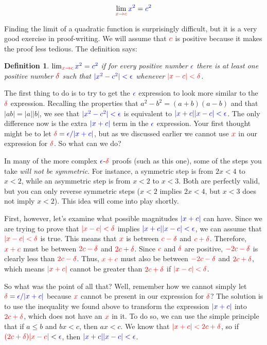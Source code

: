 \documentclass{myarticle}
\newcommand{\hor}[1]{\textcolor{red}{#1}} %
\newcommand{\ver}[1]{\textcolor{blue}{#1}}
\theoremstyle{nospace}
\newtheorem*{oldattempt}{Definition}
\newenvironment{attempt}{\begin{mdframed}\begin{oldattempt}}{\end{oldattempt}\end{mdframed}}
\newtheorem{old series theorem}{Theorem}
\newenvironment{series theorem}{\begin{mdframed}\begin{old series theorem}}{\end{old series theorem}\end{mdframed}}
\begin{document}
\[ \lim_{\hor{x \to c}} \ver{x^2} = \ver{c^2} \]

Finding the limit of a quadratic function is surprisingly difficult, but it is a very good exercise in proof-writing. We will assume that $\hor{c}$ is positive because it makes the proof less tedious. The definition says:

\begin{attempt} $\lim_{\hor{x \to c}} \ver{x^2} = \ver{c^2}$ if for every positive number $\ver{\epsilon}$ there is at least one positive number $\hor{\delta}$ such that $\ver{|x^2 - c^2| < \epsilon}$ whenever $\hor{|x - c| < \delta}$. \end{attempt}

The first thing to do is to try to get the $\ver{\epsilon}$ expression to look more similar to the $\hor{\delta}$ expression. Recalling the properties that $a^2 - b^2 = (a + b)(a - b)$ and that $|ab| = |a||b|$, we see that $\ver{|x^2 - c^2| < \epsilon}$ is equivalent to $\ver{|x + c||x - c| < \epsilon}$. The only difference now is the extra $\ver{|x + c|}$ term in the $\ver{\epsilon}$ expression. Your first thought might be to let $\hor{\delta} = \ver{\epsilon/|x + c|}$, but as we discussed earlier we cannot use $\hor{x}$ in our expression for $\hor{\delta}$. So what can we do?

In many of the more complex $\ver{\epsilon}$-$\hor{\delta}$ proofs (such as this one), some of the steps you take \emph{will not be symmetric}. For instance, a symmetric step is from $2x < 4$ to $x < 2$, while an asymmetric step is from $x < 2$ to $x < 3$. Both are perfectly valid, but you can only reverse symmetric steps ($x < 2$ implies $2x < 4$, but $x < 3$ does not imply $x < 2$). This idea will come into play shortly.

First, however, let's examine what possible magnitudes $\ver{|x + c|}$ can have. Since we are trying to prove that $\hor{|x - c| < \delta}$ implies $\ver{|x + c||x - c| < \epsilon}$, we can assume that $\hor{|x - c| < \delta}$ is true. This means that $\hor{x}$ is between $\hor{c - \delta}$ and $\hor{c + \delta}$. Therefore, $\hor{x + c}$ must be between $\hor{2c - \delta}$ and $\hor{2c + \delta}$. Since $\hor{c}$ and $\hor{\delta}$ are positive, $\hor{-2c - \delta}$ is clearly less than $\hor{2c - \delta}$. Thus, $\hor{x + c}$ must also be between $\hor{-2c - \delta}$ and $\hor{2c + \delta}$, which means $\hor{|x + c|}$ cannot be greater than $\hor{2c + \delta}$ if $\hor{|x - c| < \delta}$.

So what was the point of all that? Well, remember how we cannot simply let $\hor{\delta} = \ver{\epsilon/|x + c|}$ because $\hor{x}$ cannot be present in our expression for $\hor{\delta}$? The solution is to use the inequality we found above to transform the expression $\ver{|x + c|}$ into $\hor{2c + \delta}$, which does not have an $\hor{x}$ in it. To do so, we can use the simple principle that if $a \leq b$ and $bx < c$, then $ax < c$. We know that $\hor{|x + c| < 2c + \delta}$, so if $\hor{(2c + \delta)|x - c|} < \ver{\epsilon}$, then $\ver{|x + c||x - c| < \epsilon}$.
\end{document}
